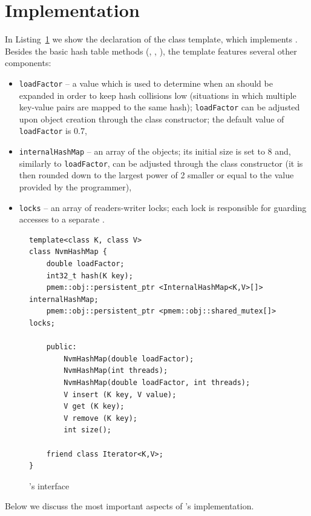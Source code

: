 \section{Implementation}

    In Listing~\ref{NvmHashMap} we show the declaration of the \NvmHashMap class template, which implements \PHT. Besides the basic hash table methods (\getMethod, \insertMethod, \removeMethod), the template features several other components:
    \begin{itemize}
        \item \texttt{loadFactor} -- a value which is used to determine when an \internalHashMap should be expanded in order to keep hash collisions low (situations in which multiple key-value pairs are mapped to the same hash); \texttt{loadFactor} can be adjusted upon object creation through the class constructor; the default value of \texttt{loadFactor} is 0.7, 
        \item \texttt{internalHashMap} -- an array of the \internalHashMap objects; its initial size is set to 8 and, similarly to \texttt{loadFactor}, can be adjusted through the class constructor (it is then rounded down to the largest power of 2 smaller or equal to the value provided by the programmer),
        \item \texttt{locks} -- an array of readers-writer locks; each lock is responsible for guarding accesses to a separate \internalHashMap.
    \end{itemize}

\begin{figure}[ht] 
\renewcommand{\figurename}{Listing}
    \begin{lstlisting}
template<class K, class V> 
class NvmHashMap {
    double loadFactor;
    int32_t hash(K key);
    pmem::obj::persistent_ptr <InternalHashMap<K,V>[]> internalHashMap;
    pmem::obj::persistent_ptr <pmem::obj::shared_mutex[]> locks;
    
    public: 
        NvmHashMap(double loadFactor);
        NvmHashMap(int threads);
        NvmHashMap(double loadFactor, int threads);
        V insert (K key, V value);
        V get (K key);
        V remove (K key);
        int size();
    
    friend class Iterator<K,V>;
}
    \end{lstlisting}
\caption{\NvmHashMap's interface}
\label{NvmHashMap}
\end{figure}

    Below we discuss the most important aspects of \PHT's implementation.
    
